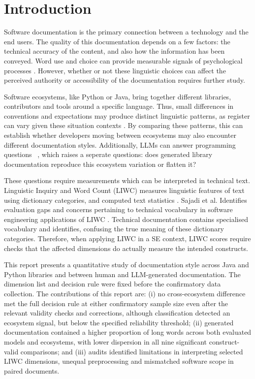 \documentclass[conference]{IEEEtran}
\begin{document}
\section{Introduction}
\label{sec:intro}

Software documentation is the primary connection between a technology and the end users. The quality of this documentation depends on a few factors: the technical accuracy of the content, and also how the information has been conveyed. Word use and choice can provide measurable signals of psychological processes \cite{tausczik2010}. However, whether or not these linguistic choices can affect the perceived authority or accessibility of the documentation requires further study.

Software ecosystems, like Python or Java, bring together different libraries, contributors and tools around a specific language. Thus, small differences in conventions and expectations may produce distinct linguistic patterns, as register can vary given these situation contexts \cite{biber1988}. By comparing these patterns, this can establish whether developers moving between ecosystems may also encounter different documentation styles. Additionally, LLMs can answer programming questions ~\cite{kabir2024}, which raises a seperate questions: does generated library documentation reproduce this ecosystem variation or flatten it?

These questions require measurements which can be interpreted in technical text. Linguistic Inquiry and Word Count (LIWC) measures linguistic features of text using dictionary categories, and computed text statistics \cite{boyd2022}. Sajadi et al. Identifies evaluation gaps and concerns pertaining to technical vocabulary in software engineering applications of LIWC \cite{sajadi2026}. Technical documentation contains specialised vocabulary and identifies, confusing the true meaning of these dictionary categories. Therefore, when applying LIWC in a SE context, LIWC scores require checks that the affected dimensions do actually measure the intended constructs.

This report presents a quantitative study of documentation style across Java and Python libraries and between human and LLM-generated documentation. The dimension list and decision rule were fixed before the confirmatory data collection. The contributions of this report are: (i) no cross-ecosystem difference met the full decision rule at either confirmatory sample size even after the relevant validity checks and corrections, although classification detected an ecosystem signal, but below the specified reliability threshold; (ii) generated documentation contained a higher proportion of long words across both evaluated models and ecosystems, with lower dispersion in all nine significant construct-valid comparisons; and (iii) audits identified limitations in interpreting selected LIWC dimensions, unequal preprocessing and mismatched software scope in paired documents.
\end{document}
